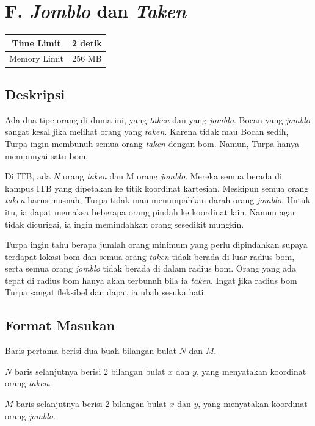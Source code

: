 \documentclass{article}
\begin{document}
\section*{\hfil F. \textit{Jomblo} dan \textit{Taken}\hfil}

\begin{center}
\begin{tabular}{ |cc| } 
 \hline
 Time Limit & 2 detik \\
 \hline 
 Memory Limit & 256 MB \\
 \hline
\end{tabular}
\end{center}

\subsection*{Deskripsi}

\par\noindent Ada dua tipe orang di dunia ini, yang \textit{taken} dan yang \textit{jomblo}. Bocan yang \textit{jomblo} sangat kesal jika melihat orang yang \textit{taken}. Karena tidak mau Bocan sedih, Turpa ingin membunuh semua orang \textit{taken} dengan bom. Namun, Turpa hanya mempunyai satu bom.

\par\noindent Di ITB, ada $N$ orang \textit{taken} dan M orang \textit{jomblo}. Mereka semua berada di kampus ITB yang dipetakan ke titik koordinat kartesian. Meskipun semua orang \textit{taken} harus musnah, Turpa tidak mau menumpahkan darah orang \textit{jomblo}. Untuk itu, ia dapat memaksa beberapa orang pindah ke koordinat lain. Namun agar tidak dicurigai, ia ingin memindahkan orang sesedikit mungkin.

\par\noindent Turpa ingin tahu berapa jumlah orang minimum yang perlu dipindahkan supaya terdapat lokasi bom dan semua orang \textit{taken} tidak berada di luar radius bom, serta semua orang \textit{jomblo} tidak berada di dalam radius bom. Orang yang ada tepat di radius bom hanya akan terbunuh bila ia \textit{taken}. Ingat jika radius bom Turpa sangat fleksibel dan dapat ia ubah sesuka hati.

\subsection*{Format Masukan}

\par\noindent Baris pertama berisi dua buah bilangan bulat $N$ dan $M$.
\par\noindent $N$ baris selanjutnya berisi 2 bilangan bulat $x$ dan $y$, yang menyatakan koordinat orang \textit{taken}.
\par\noindent $M$ baris selanjutnya berisi 2 bilangan bulat $x$ dan $y$, yang menyatakan koordinat orang \textit{jomblo}.
\end{document}
